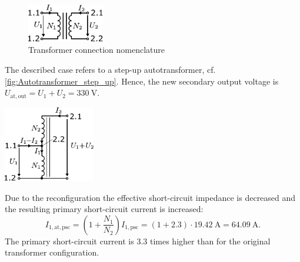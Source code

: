 \begin{figure}[ht]
    \centering
    \includegraphics[width=0.3\textwidth]{fig/Autotransformer_connection.pdf}
    \caption{Transformer connection nomenclature}
    \label{fig:Autotransformer_connection}
\end{figure}

\begin{solutionblock}
The described case refers to a step-up autotransformer, cf. \autoref{fig:Autotransformer_step_up}. Hence, the new secondary output voltage is $U_\mathrm{at,out} = U_1 + U_2 = \SI{330}{\volt}.$
    \begin{solutionfigure}[ht]
    \centering
    \includegraphics[width=0.3\textwidth]{fig/Autotransformer_step_up.pdf}
    \caption{Step-up autotransformer}
    \label{fig:Autotransformer_step_up}
\end{solutionfigure}
\end{solutionblock}


\begin{solutionblock}
    Due to the reconfiguration the effective short-circuit impedance is decreased and the resulting primary short-circuit current is increased:
    $$
    I_{1,\mathrm{at,psc}} = \left(1+ \frac{N_1}{N_2}\right) I_{1,\mathrm{psc}} = (1+2.3) \cdot \SI{19.42}{\ampere} = \SI{64.09}{\ampere}. 
    $$
    The primary short-circuit current is $3.3$ times higher than for the original transformer configuration. 
\end{solutionblock}
